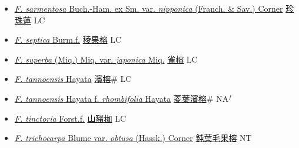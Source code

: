 \begin{itemize}
\begin{itemize}
        \item[] \href{http://www.theplantlist.org/tpl1.1/search?q=Ficus+sarmentosa+var.+nipponica}{\textit{F. sarmentosa} Buch.-Ham. ex Sm. var. \textit{nipponica} (Franch. \& Sav.) Corner}   \href{\detokenize{http://taibnet.sinica.edu.tw/chi/taibnet_species_list.php?T2=珍珠蓮&T2_new_value=true&fr=y}}{珍珠蓮} LC
        \item[] \href{http://www.theplantlist.org/tpl1.1/search?q=Ficus+septica}{\textit{F. septica} Burm.f.}   \href{\detokenize{http://taibnet.sinica.edu.tw/chi/taibnet_species_list.php?T2=稜果榕&T2_new_value=true&fr=y}}{稜果榕} LC
        \item[] \href{http://www.theplantlist.org/tpl1.1/search?q=Ficus+superba+var.+japonica}{\textit{F. superba} (Miq.) Miq. var. \textit{japonica} Miq.}   \href{\detokenize{http://taibnet.sinica.edu.tw/chi/taibnet_species_list.php?T2=雀榕&T2_new_value=true&fr=y}}{雀榕} LC
        \item[] \href{http://www.theplantlist.org/tpl1.1/search?q=Ficus+tannoensis}{\textit{F. tannoensis} Hayata}   \href{\detokenize{http://taibnet.sinica.edu.tw/chi/taibnet_species_list.php?T2=濱榕&T2_new_value=true&fr=y}}{濱榕}\# LC
        \item[] \href{http://www.theplantlist.org/tpl1.1/search?q=Ficus+tannoensis+ f. +rhombifolia}{\textit{F. tannoensis} Hayata  f.  \textit{rhombifolia} Hayata}   \href{\detokenize{http://taibnet.sinica.edu.tw/chi/taibnet_species_list.php?T2=菱葉濱榕&T2_new_value=true&fr=y}}{菱葉濱榕}\# NA$^f$
        \item[] \href{http://www.theplantlist.org/tpl1.1/search?q=Ficus+tinctoria}{\textit{F. tinctoria} Forst.f.}   \href{\detokenize{http://taibnet.sinica.edu.tw/chi/taibnet_species_list.php?T2=山豬枷&T2_new_value=true&fr=y}}{山豬枷} LC
        \item[] \href{http://www.theplantlist.org/tpl1.1/search?q=Ficus+trichocarpa+var.+obtusa}{\textit{F. trichocarpa} Blume var. \textit{obtusa} (Hassk.) Corner}   \href{\detokenize{http://taibnet.sinica.edu.tw/chi/taibnet_species_list.php?T2=鈍葉毛果榕&T2_new_value=true&fr=y}}{鈍葉毛果榕} NT

\end{itemize}
\end{itemize}
